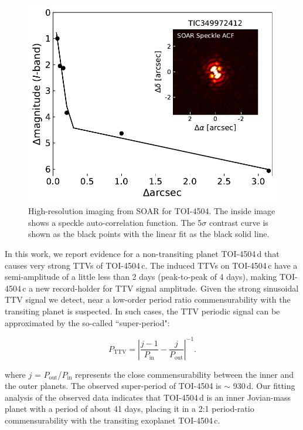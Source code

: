\documentclass[twocolumn,twocolappendix]{aastex631}
\begin{document}
\begin{figure}[ht!]
  \centering
  \includegraphics[width=0.9\linewidth]{TIC349972412I-cz20220415-2.pdf}
  \caption{High-resolution imaging from SOAR for TOI-4504. The inside image shows a speckle auto-correlation function. The 5$\sigma$ contrast curve is shown as the black points with the linear fit as the black solid line.}
  \label{Imaging}
\end{figure}


In this work, we report evidence for a non-transiting planet TOI-4504\,d that causes very strong TTVs of TOI-4504\,c. The induced TTVs on TOI-4504\,c have a semi-amplitude of a little less than 2 days (peak-to-peak of 4 days), making TOI-4504\,c a new record-holder for TTV signal amplitude.
Given the strong sinusoidal TTV signal we detect, near a low-order period ratio commensurability with the transiting planet is suspected. In such cases, the TTV periodic signal can be approximated by the so-called ``super-period":

\begin{equation}
{P}_{\mathrm{TTV}}={\left|\frac{j-1}{{P}_{\mathrm{in}}}-\frac{j}{{P}_{\mathrm{out}}}\right|}^{-1}.
\end{equation}

\noindent
where $j$ = $P_{\mathrm{out}}$/$P_{\mathrm{in}}$ represents the close commensurability between the inner and the outer planets. The observed super-period of TOI-4504 is $\sim$ 930\,d. Our fitting analysis of the observed data indicates that TOI-4504\,d is an inner Jovian-mass planet with a period of about 41 days, placing it in a 2:1 period-ratio commensurability with the transiting exoplanet TOI-4504\,c.
\end{document}
